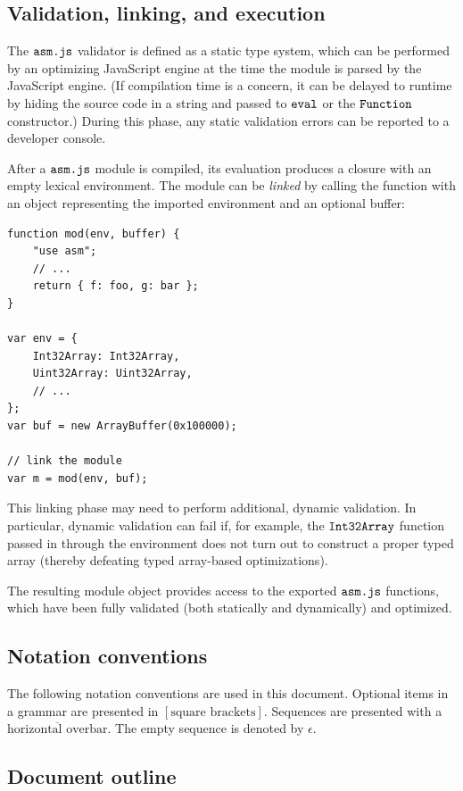 \documentclass{article}
\newcommand{\seq}[1]{\overline{{#1}}}
\newcommand{\mathjs}[1]{\mbox{\texttt{{#1}}}}
\begin{document}
\subsection{Validation, linking, and execution}

The $\mathjs{asm.js}$ validator is defined as a static type system,
which can be performed by an optimizing JavaScript engine at the time
the module is parsed by the JavaScript engine. (If compilation time is
a concern, it can be delayed to runtime by hiding the source code in a
string and passed to $\mathjs{eval}$ or the $\mathjs{Function}$
constructor.) During this phase, any static validation errors can be
reported to a developer console.

After a $\mathjs{asm.js}$ module is compiled, its evaluation produces
a closure with an empty lexical environment. The module can be {\it
linked} by calling the function with an object representing the
imported environment and an optional buffer:
\begin{verbatim}
function mod(env, buffer) {
    "use asm";
    // ...
    return { f: foo, g: bar };
}

var env = {
    Int32Array: Int32Array,
    Uint32Array: Uint32Array,
    // ...
};
var buf = new ArrayBuffer(0x100000);

// link the module
var m = mod(env, buf);
\end{verbatim}

This linking phase may need to perform additional, dynamic
validation. In particular, dynamic validation can fail if, for
example, the $\mathjs{Int32Array}$ function passed in through the
environment does not turn out to construct a proper typed array
(thereby defeating typed array-based optimizations).

The resulting module object provides access to the exported
$\mathjs{asm.js}$ functions, which have been fully validated (both
statically and dynamically) and optimized.

\subsection{Notation conventions}

The following notation conventions are used in this document. Optional
items in a grammar are presented in $[\mbox{square
brackets}]$. Sequences are presented with a $\seq{\mbox{horizontal
overbar}}$. The empty sequence is denoted by $\epsilon$.

\subsection{Document outline}
\end{document}
